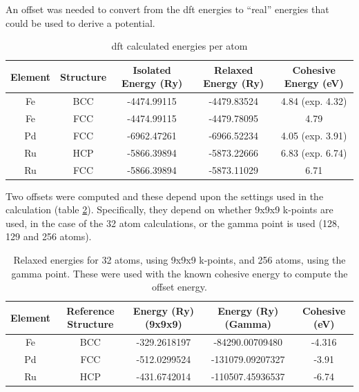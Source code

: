 An offset was needed to convert from the \acrshort{dft} energies to \enquote{real} energies that could be used to derive a potential.

\begin{table}[h]
\begin{center}
\begin{tabular}{c c c c c}
\hline\hline
Element & Structure & Isolated Energy (Ry) & Relaxed Energy (Ry) & Cohesive Energy (eV) \\
\hline\hline
Fe      & BCC       & -4474.99115          & -4479.83524         & 4.84 (exp. 4.32)\\
Fe      & FCC       & -4474.99115          & -4479.78095         & 4.79 \\
Pd      & FCC       & -6962.47261          & -6966.52234         & 4.05 (exp. 3.91)\\
Ru      & HCP       & -5866.39894          & -5873.22666         & 6.83 (exp. 6.74)\\
Ru      & FCC       & -5866.39894          & -5873.11029         & 6.71 \\
\hline\hline
\end{tabular}
\end{center}
\caption{\acrshort{dft} calculated energies per atom}
\label{table:calculatedcohesiveenergies}
\end{table}

Two offsets were computed and these depend upon the settings used in the calculation (table \ref{table:calculatedoffset}).  Specifically, they depend on whether 9x9x9 k-points are used, in the case of the 32 atom calculations, or the gamma point is used (128, 129 and 256 atoms).

\begin{table}[h]
\begin{center}
\begin{tabular}{c c c c c}
\hline\hline
Element & Reference Structure & Energy (Ry) (9x9x9) & Energy (Ry) (Gamma) & Cohesive (eV)\\
\hline\hline
Fe      & BCC  & -329.2618197  & -84290.00709480 & -4.316 \\
Pd      & FCC  & -512.0299524  & -131079.09207327 & -3.91 \\
Ru      & HCP  & -431.6742014  & -110507.45936537 & -6.74 \\
\hline\hline
\end{tabular}
\end{center}
\caption{Relaxed energies for 32 atoms, using 9x9x9 k-points, and 256 atoms, using the gamma point.  These were used with the known cohesive energy to compute the offset energy.}
\label{table:calculatedoffset}
\end{table}

